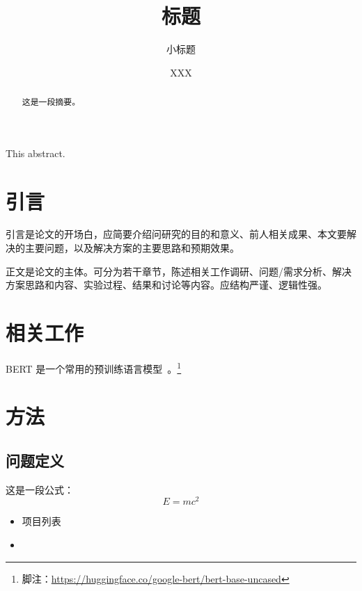\documentclass[12pt,fontset=fandol]{ctexart}
\title{标题}
\subtitle{小标题}
\author{XXX}
\begin{document}
\maketitle
\makedeclare


\newpage
\begin{abstract}
这是一段摘要。
\end{abstract}

\begin{enabstract}
This abstract.
\end{enabstract}
\newpage

\tableofcontents
\newpage

\makedoc

\section{引言}

引言是论文的开场白，应简要介绍问研究的目的和意义、前人相关成果、本文要解决的主要问题，以及解决方案的主要思路和预期效果。

正文是论文的主体。可分为若干章节，陈述相关工作调研、问题/需求分析、解决方案思路和内容、实验过程、结果和讨论等内容。应结构严谨、逻辑性强。

\section{相关工作}

BERT 是一个常用的预训练语言模型~\cite{devlin2018bert}。\footnote{脚注：\url{https://huggingface.co/google-bert/bert-base-uncased}}

\section{方法}

\subsection{问题定义}

这是一段公式：
\begin{equation}
    E = mc^2
\end{equation}

\begin{itemize}
    \item 项目列表
    \item
\end{itemize}
\end{document}
